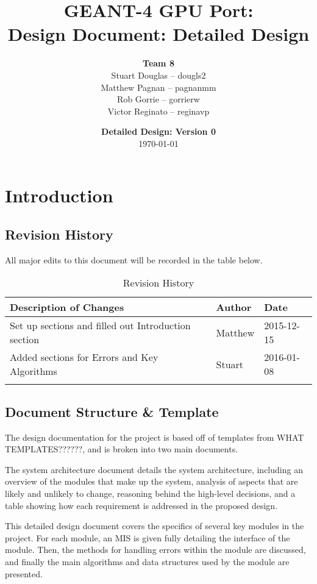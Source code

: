 \documentclass[12pt]{article}
\title{
\LARGE GEANT-4 GPU Port:
\\\vspace{10mm}
\large \textbf{Design Document: Detailed Design}
\vspace{40mm}
}
\author{
\textbf{Team 8}
\\Stuart Douglas -- dougls2
\\Matthew Pagnan -- pagnanmm
\\Rob Gorrie -- gorrierw
\\Victor Reginato -- reginavp
\vspace{10mm}
}
\date{\vfill \textbf{Detailed Design: Version 0}\\ \today}
\begin{document}

\maketitle
\newpage

\renewcommand{\contentsname}{Table of Contents}
\tableofcontents
\newpage
{}

\section{Introduction}
\subsection{Revision History}
All major edits to this document will be recorded in the table below.

\begin{table}[h]
\centering
\caption{Revision History}\label{Table_Revision}
\begin{tabular}{lll}

\toprule
\bf Description of Changes & \bf Author & \bf Date\\\midrule
\arrayrulecolor{lightgray}
Set up sections and filled out Introduction section & Matthew & 2015-12-15\\\hline
Added sections for Errors and Key Algorithms & Stuart & 2016-01-08\\
\arrayrulecolor{black}
\bottomrule
\end{tabular}
\end{table}

\subsection{Document Structure \& Template}
The design documentation for the project is based off of templates from WHAT TEMPLATES??????, and is broken into two main documents.

The system architecture document details the system architecture, including an overview of the modules that make up the system, analysis of aspects that are likely and unlikely to change, reasoning behind the high-level decisions, and a table showing how each requirement is addressed in the proposed design.

This detailed design document covers the specifics of several key modules in the project. For each module, an MIS is given fully detailing the interface of the module. Then, the methods for handling errors within the module are discussed, and finally the main algorithms and data structures used by the module are presented.
\end{document}
